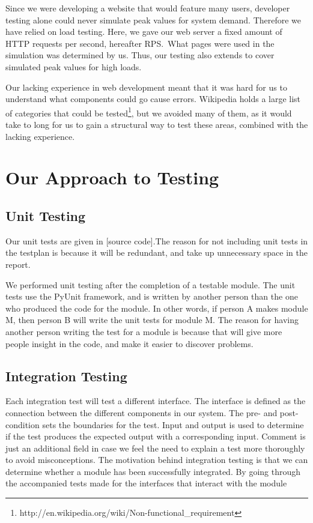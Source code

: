 Since we were developing a website that would feature many users, developer
testing alone could never simulate peak values for system demand. Therefore we
have relied on load testing. Here, we gave our web server a fixed amount of
HTTP requests per second, hereafter RPS.\ What pages were used in the
simulation was determined by us. Thus, our testing also extends to cover
simulated peak values for high loads.


Our lacking experience in web development meant that it was hard for us to
understand what components could go cause errors. Wikipedia holds a large list
of categories that could be
tested\footnote{http://en.wikipedia.org/wiki/Non-functional\_requirement}, but
we avoided many of them, as it would take to long for us to gain a structural
way to test these areas, combined with the lacking experience. 

\section{Our Approach to Testing}
\subsection{Unit Testing}
Our unit tests are given in [source code].The reason for not including unit
tests in the testplan is because it will be redundant, and take up unnecessary
space in the report.

We performed unit testing after the completion of a testable module. The unit
tests use the PyUnit framework, and is written by another person than the one
who produced the code for the module. In other words, if person A makes module
M, then person B will write the unit tests for module M. The reason for having
another person writing the test for a module is because that will give more
people insight in the code, and make it easier to discover problems.

\subsection{Integration Testing} Each integration test will test a different
interface. The interface is defined as the connection between the different
components in our system. The pre- and post-condition sets the boundaries for
the test.  Input and output is used to determine if the test produces the
expected output with a corresponding input. Comment is just an additional field
in case we feel the need to explain a test more thoroughly to avoid
misconceptions. The motivation behind integration testing is that we can
determine whether a module has been successfully integrated. By going through
the accompanied tests made for the interfaces that interact with the module


